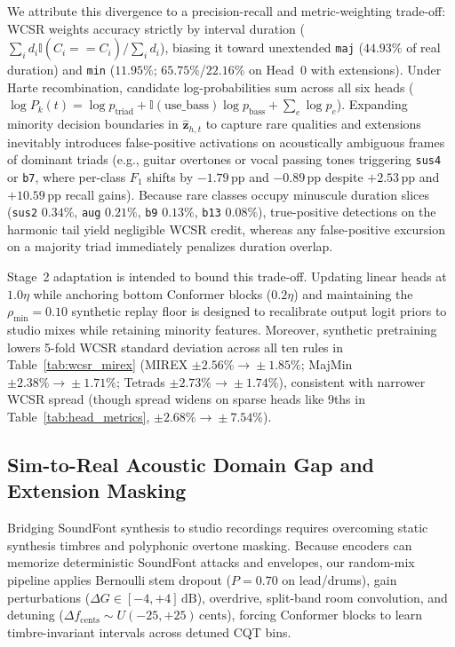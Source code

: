 \documentclass{article}
\begin{document}
We attribute this divergence to a precision-recall and metric-weighting trade-off: WCSR weights accuracy strictly by interval duration ($\sum_i d_i \mathbb{I}(\hat{C}_i == C_i) / \sum_i d_i$), biasing it toward unextended {\small\texttt{maj}} ($44.93\%$ of real duration) and {\small\texttt{min}} ($11.95\%$; $65.75\%$/$22.16\%$ on Head~0 with extensions). Under Harte recombination, candidate log-probabilities sum across all six heads ($\log P_k(t) = \log p_{\text{triad}} + \mathbb{I}(\text{use\_bass})\log p_{\text{bass}} + \sum_e \log p_e$). Expanding minority decision boundaries in $\hat{\mathbf{z}}_{h,t}$ to capture rare qualities and extensions inevitably introduces false-positive activations on acoustically ambiguous frames of dominant triads (e.g., guitar overtones or vocal passing tones triggering {\small\texttt{sus4}} or {\small\texttt{b7}}, where per-class $F_1$ shifts by $-1.79\,\text{pp}$ and $-0.89\,\text{pp}$ despite $+2.53\,\text{pp}$ and $+10.59\,\text{pp}$ recall gains). Because rare classes occupy minuscule duration slices ({\small\texttt{sus2}} $0.34\%$, {\small\texttt{aug}} $0.21\%$, {\small\texttt{b9}} $0.13\%$, {\small\texttt{b13}} $0.08\%$), true-positive detections on the harmonic tail yield negligible WCSR credit, whereas any false-positive excursion on a majority triad immediately penalizes duration overlap.

Stage~2 adaptation is intended to bound this trade-off. Updating linear heads at $1.0\eta$ while anchoring bottom Conformer blocks ($0.2\eta$) and maintaining the $\rho_{\min} = 0.10$ synthetic replay floor is designed to recalibrate output logit priors to studio mixes while retaining minority features. Moreover, synthetic pretraining lowers 5-fold WCSR standard deviation across all ten rules in Table~\ref{tab:wcsr_mirex} (MIREX $\pm 2.56\% \!\to\! \pm 1.85\%$; MajMin $\pm 2.38\% \!\to\! \pm 1.71\%$; Tetrads $\pm 2.73\% \!\to\! \pm 1.74\%$), consistent with narrower WCSR spread (though spread widens on sparse heads like 9ths in Table~\ref{tab:head_metrics}, $\pm 2.68\% \!\to\! \pm 7.54\%$).

\subsection{Sim-to-Real Acoustic Domain Gap and Extension Masking}\label{subsec:acoustic_domain_gap}

Bridging SoundFont synthesis to studio recordings requires overcoming static synthesis timbres and polyphonic overtone masking. Because encoders can memorize deterministic SoundFont attacks and envelopes, our random-mix pipeline applies Bernoulli stem dropout ($P=0.70$ on lead/drums), gain perturbations ($\Delta G \in [-4, +4]\,\text{dB}$), overdrive, split-band room convolution, and detuning ($\Delta f_{\text{cents}} \sim U(-25, +25)\,\text{cents}$), forcing Conformer blocks to learn timbre-invariant intervals across detuned CQT bins.
\end{document}
